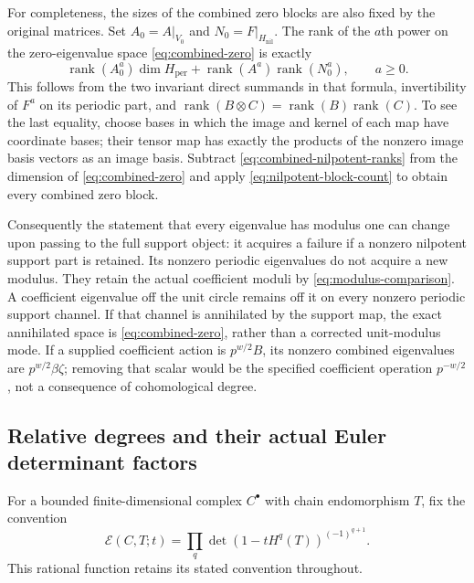 \documentclass[11pt,a4paper]{article}
\theoremstyle{definition}\newtheorem{definition}[theorem]{Definition}
\begin{document}
For completeness, the sizes of the combined zero blocks are also
fixed by the original matrices. Set $A_0=A|_{V_0}$ and
$N_0=F|_{H_{\mathrm{nil}}}$. The rank of the $a$th power on the
zero-eigenvalue space \eqref{eq:combined-zero} is exactly
\[
 \operatorname{rank}(A_0^a)\dim H_{\mathrm{per}}
  +\operatorname{rank}(A^a)\operatorname{rank}(N_0^a),
 \qquad a\ge0.
 \tag{SE12a}\label{eq:combined-nilpotent-ranks}
\]
This follows from the two invariant direct summands in that formula,
invertibility of $F^a$ on its periodic part, and
$\operatorname{rank}(B\otimes C)=\operatorname{rank}(B)
\operatorname{rank}(C)$. To see the last equality, choose bases in
which the image and kernel of each map have coordinate bases;
their tensor map has exactly the products of the nonzero image basis
vectors as an image basis. Subtract
\eqref{eq:combined-nilpotent-ranks} from the dimension of
\eqref{eq:combined-zero} and apply
\eqref{eq:nilpotent-block-count} to obtain every combined zero block.

Consequently the statement that every eigenvalue has modulus one can
change upon passing to the full support object: it acquires a failure
if a nonzero nilpotent support part is retained. Its nonzero periodic
eigenvalues do not acquire a new modulus. They retain the actual
coefficient moduli by \eqref{eq:modulus-comparison}. A coefficient
eigenvalue off the unit circle remains off it on every nonzero
periodic support channel. If that channel is annihilated by the
support map, the exact annihilated space is
\eqref{eq:combined-zero}, rather than a corrected unit-modulus mode.
If a supplied coefficient action is $p^{w/2}B$, its nonzero combined
eigenvalues are $p^{w/2}\beta\zeta$; removing that scalar would be
the specified coefficient operation $p^{-w/2}$, not a consequence
of cohomological degree.

\subsection{Relative degrees and their actual Euler determinant factors}

For a bounded finite-dimensional complex $C^\bullet$ with chain
endomorphism $T$, fix the convention
\[
 \mathcal E(C,T;t)=
 \prod_q\det(1-tH^q(T))^{(-1)^{q+1}}.
 \tag{SE14}\label{eq:euler-determinant}
\]
This rational function retains its stated convention throughout.
\end{document}
